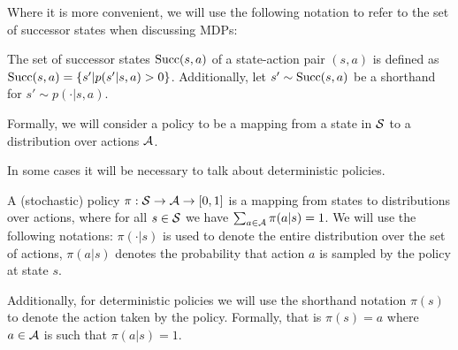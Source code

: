     Where it is more convenient, we will use the following notation to refer to the set of successor states when discussing MDPs:
    \begin{defn}
        \label{def:succ}
        The set of \textnormal{successor states} $\textnormal{Succ}(s,a)$ of a state-action pair $(s,a)$ is defined as $\textnormal{Succ}(s,a)=\{s'|p(s'|s,a)>0\}$. Additionally, let $s'\sim \textnormal{Succ}(s,a)$ be a shorthand for $s'\sim p(\cdot|s,a)$.
    \end{defn}


    Formally, we will consider a policy to be a mapping from a state in $\mathcal{S}$ to a distribution over actions $\mathcal{A}$. 


    In some cases it will be necessary to talk about deterministic policies. 

    \begin{defn}
        \label{def:policy}
        A \textnormal{(stochastic) policy} $\pi:\mathcal{S}\rightarrow \mathcal{A} \rightarrow [0,1]$ is a mapping from states to distributions over actions, where for all $s \in \mathcal{S}$ we have $\sum_{a\in\mathcal{A}} \pi(a|s) = 1$. We will use the following notations: $\pi(\cdot|s)$ is used to denote the entire distribution over the set of actions, $\pi(a|s)$ denotes the probability that action $a$ is sampled by the policy at state $s$. 

        Additionally, for \textnormal{deterministic policies} we will use the shorthand notation $\pi(s)$ to denote the action taken by the policy. Formally, that is $\pi(s)=a$ where $a\in\mathcal{A}$ is such that $\pi(a|s)=1$.
    \end{defn}


